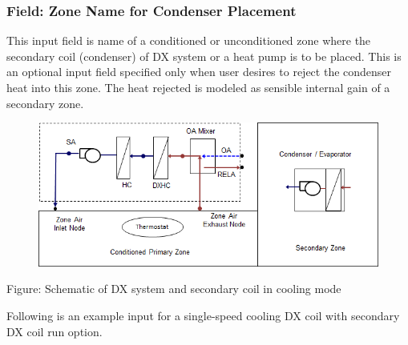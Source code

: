 \subsubsection{Field: Zone Name for Condenser Placement}\label{field-zone-name-for-condenser-placement-3}

This input field is name of a conditioned or unconditioned zone where the secondary coil (condenser) of DX system or a heat pump is to be placed. This is an optional input field specified only when user desires to reject the condenser heat into this zone. The heat rejected is modeled as sensible internal gain of a secondary zone.

\begin{figure}[htbp]
\centering
\includegraphics{media/image904.png}
\caption{}
\end{figure}

Figure: Schematic of DX system and secondary coil in cooling mode

Following is an example input for a single-speed cooling DX coil with secondary DX coil run option.

